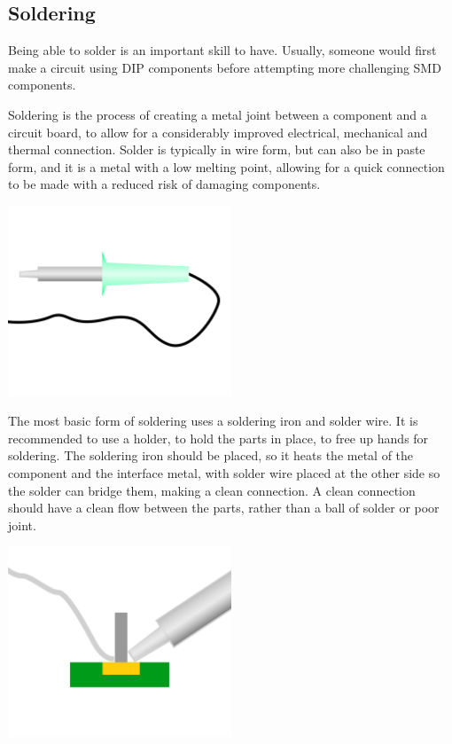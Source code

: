 \documentclass[a4paper,11pt]{report}
\begin{document}
\subsection{Soldering}

Being able to solder is an important skill to have. Usually, someone would first make a circuit using DIP components before attempting more challenging SMD components.

Soldering is the process of creating a metal joint between a component and a circuit board, to allow for a considerably improved electrical, mechanical and thermal connection. Solder is typically in wire form, but can also be in paste form, and it is a metal with a low melting point, allowing for a quick connection to be made with a reduced risk of damaging components.

\includegraphics[width=0.5\textwidth]{solderingiron}

The most basic form of soldering uses a soldering iron and solder wire. It is recommended to use a holder, to hold the parts in place, to free up hands for soldering. The soldering iron should be placed, so it heats the metal of the component and the interface metal, with solder wire placed at the other side so the solder can bridge them, making a clean connection. A clean connection should have a clean flow between the parts, rather than a ball of solder or poor joint.

\includegraphics[width=0.5\textwidth]{soldering}
\end{document}
